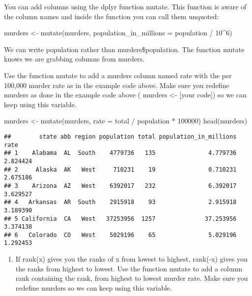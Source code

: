 \documentclass[
]{article}
\newenvironment{Shaded}{\begin{snugshade}}{\end{snugshade}}
\newcommand{\AttributeTok}[1]{\textcolor[rgb]{0.77,0.63,0.00}{#1}}
\newcommand{\DecValTok}[1]{\textcolor[rgb]{0.00,0.00,0.81}{#1}}
\newcommand{\FunctionTok}[1]{\textcolor[rgb]{0.00,0.00,0.00}{#1}}
\newcommand{\NormalTok}[1]{#1}
\newcommand{\OtherTok}[1]{\textcolor[rgb]{0.56,0.35,0.01}{#1}}
\newcommand{\SpecialCharTok}[1]{\textcolor[rgb]{0.00,0.00,0.00}{#1}}
\providecommand{\tightlist}{%
  \setlength{\itemsep}{0pt}\setlength{\parskip}{0pt}}
\begin{document}
You can add columns using the dplyr function mutate. This function is
aware of the column names and inside the function you can call them
unquoted:

\begin{Shaded}
\begin{Highlighting}[]
\NormalTok{murders }\OtherTok{\textless{}{-}} \FunctionTok{mutate}\NormalTok{(murders, }\AttributeTok{population\_in\_millions =}\NormalTok{ population }\SpecialCharTok{/} \DecValTok{10}\SpecialCharTok{\^{}}\DecValTok{6}\NormalTok{)}
\end{Highlighting}
\end{Shaded}

We can write population rather than murders\$population. The function
mutate knows we are grabbing columns from murders.

Use the function mutate to add a murders column named rate with the per
100,000 murder rate as in the example code above. Make sure you redefine
murders as done in the example code above ( murders \textless- {[}your
code{]}) so we can keep using this variable.

\begin{Shaded}
\begin{Highlighting}[]
\NormalTok{murders }\OtherTok{\textless{}{-}} \FunctionTok{mutate}\NormalTok{(murders, }\AttributeTok{rate =}\NormalTok{ total }\SpecialCharTok{/}\NormalTok{ population }\SpecialCharTok{*} \DecValTok{100000}\NormalTok{)}
\FunctionTok{head}\NormalTok{(murders)}
\end{Highlighting}
\end{Shaded}

\begin{verbatim}
##        state abb region population total population_in_millions     rate
## 1    Alabama  AL  South    4779736   135               4.779736 2.824424
## 2     Alaska  AK   West     710231    19               0.710231 2.675186
## 3    Arizona  AZ   West    6392017   232               6.392017 3.629527
## 4   Arkansas  AR  South    2915918    93               2.915918 3.189390
## 5 California  CA   West   37253956  1257              37.253956 3.374138
## 6   Colorado  CO   West    5029196    65               5.029196 1.292453
\end{verbatim}

\begin{enumerate}
\def\labelenumi{\arabic{enumi}.}
\setcounter{enumi}{1}
\tightlist
\item
  If rank(x) gives you the ranks of x from lowest to highest, rank(-x)
  gives you the ranks from highest to lowest. Use the function mutate to
  add a column rank containing the rank, from highest to lowest murder
  rate. Make sure you redefine murders so we can keep using this
  variable.
\end{enumerate}
\end{document}
